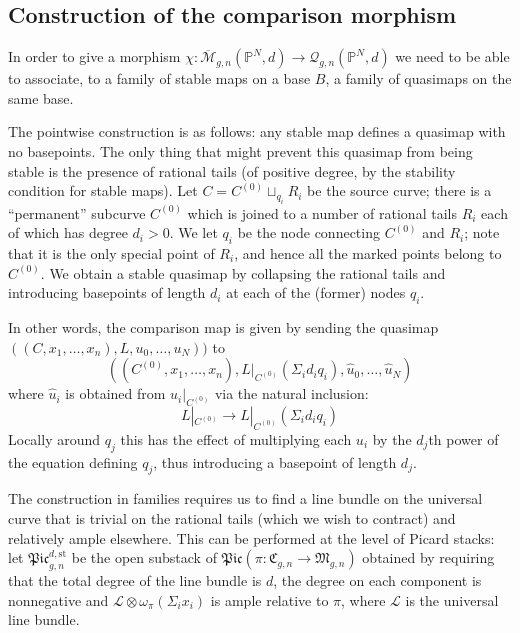 \documentclass[11pt]{amsart}
\newcommand{\M}[4]{\overline{\mathcal{M}}_{#1,#2}(#3,#4)}
\newcommand{\Q}[4]{\mathcal{Q}_{#1,#2}(#3,#4)}
\newcommand{\PP}{\mathbb P}
\renewcommand{\to}{\rightarrow}
\theoremstyle{definition}
\theoremstyle{definition}
\begin{document}
\subsection{Construction of the comparison morphism}
In order to give a morphism $\chi\colon\M{g}{n}{\PP^N}{d}\to\Q{g}{n}{\PP^N}{d}$ we need to be able to associate, to a family of stable maps on a base $B$, a family of quasimaps on the same base.

The pointwise construction is as follows: any stable map defines a quasimap with no basepoints. The only thing that might prevent this quasimap from being stable is the presence of rational tails (of positive degree, by the stability condition for stable maps). Let $C=C^{(0)}\sqcup_{q_i}R_i$ be the source curve; there is a ``permanent'' subcurve $C^{(0)}$ which is joined to a number of rational tails $R_i$ each of which has degree $d_i>0$. We let $q_i$ be the node connecting $C^{(0)}$ and $R_i$; note that it is the only special point of $R_i$, and hence all the marked points belong to $C^{(0)}$. We obtain a stable quasimap by collapsing the rational tails and introducing basepoints of length $d_i$ at each of the (former) nodes $q_i$.

In other words, the comparison map is given by sending the quasimap $((C,x_1,\ldots,x_n),L,u_0,\ldots,u_N))$ to 
\begin{equation*}((C^{(0)},x_1,\ldots,x_n),L|_{C^{(0)}}(\Sigma_i d_i q_i),\hat{u}_0,\ldots,\hat{u}_N) \end{equation*}
where $\hat{u}_i$ is obtained from $u_i|_{C^{(0)}}$ via the natural inclusion:
\begin{equation*} L|_{C^{(0)}}\to L|_{C^{(0)}}(\Sigma_i d_i q_i) \end{equation*}
Locally around $q_j$ this has the effect of multiplying each $u_i$ by the $d_j$th power of the equation defining $q_j$, thus introducing a basepoint of length $d_j$.

The construction in families requires us to find a line bundle on the universal curve that is trivial on the rational tails (which we wish to contract) and relatively ample elsewhere. This can be performed at the level of Picard stacks: let $\mathfrak{Pic}_{g,n}^{d,\text{st}}$ be the open substack of $\mathfrak{Pic}(\pi\colon\mathfrak{C}_{g,n}\to\mathfrak{M}_{g,n})$ obtained by requiring that the total degree of the line bundle is $d$, the degree on each component is nonnegative and $\mathcal L\otimes\omega_{\pi}(\Sigma_i x_i)$ is ample relative to $\pi$, where $\mathcal L$ is the universal line bundle.
\end{document}
